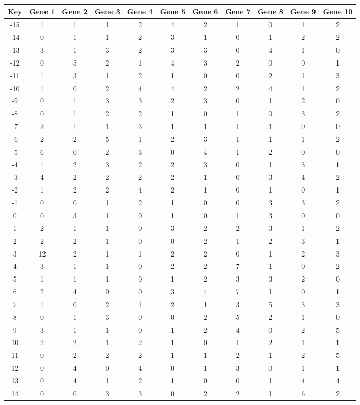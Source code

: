 \begin{tabular}{|c|c|c|c|c|c|c|c|c|c|c|}
\hline
Key & Gene 1 & Gene 2 & Gene 3 & Gene 4 & Gene 5 & Gene 6 & Gene 7 & Gene 8 & Gene 9 & Gene 10 \\
\hline
-15 & 1 & 1 & 1 & 2 & 4 & 2 & 1 & 0 & 1 & 2 \\
-14 & 0 & 1 & 1 & 2 & 3 & 1 & 0 & 1 & 2 & 2 \\
-13 & 3 & 1 & 3 & 2 & 3 & 3 & 0 & 4 & 1 & 0 \\
-12 & 0 & 5 & 2 & 1 & 4 & 3 & 2 & 0 & 0 & 1 \\
-11 & 1 & 3 & 1 & 2 & 1 & 0 & 0 & 2 & 1 & 3 \\
-10 & 1 & 0 & 2 & 4 & 4 & 2 & 2 & 4 & 1 & 2 \\
-9 & 0 & 1 & 3 & 3 & 2 & 3 & 0 & 1 & 2 & 0 \\
-8 & 0 & 1 & 2 & 2 & 1 & 0 & 1 & 0 & 3 & 2 \\
-7 & 2 & 1 & 1 & 3 & 1 & 1 & 1 & 1 & 0 & 0 \\
-6 & 2 & 2 & 5 & 1 & 2 & 3 & 1 & 1 & 1 & 2 \\
-5 & 6 & 0 & 2 & 3 & 0 & 4 & 1 & 2 & 0 & 0 \\
-4 & 1 & 2 & 3 & 2 & 2 & 3 & 0 & 1 & 3 & 1 \\
-3 & 4 & 2 & 2 & 2 & 2 & 1 & 0 & 3 & 4 & 2 \\
-2 & 1 & 2 & 2 & 4 & 2 & 1 & 0 & 1 & 0 & 1 \\
-1 & 0 & 0 & 1 & 2 & 1 & 0 & 0 & 3 & 3 & 2 \\
0 & 0 & 3 & 1 & 0 & 1 & 0 & 1 & 3 & 0 & 0 \\
1 & 2 & 1 & 1 & 0 & 3 & 2 & 2 & 3 & 1 & 2 \\
2 & 2 & 2 & 1 & 0 & 0 & 2 & 1 & 2 & 3 & 1 \\
3 & 12 & 2 & 1 & 1 & 2 & 2 & 0 & 1 & 2 & 3 \\
4 & 3 & 1 & 1 & 0 & 2 & 2 & 7 & 1 & 0 & 2 \\
5 & 1 & 1 & 1 & 0 & 1 & 2 & 3 & 3 & 2 & 0 \\
6 & 2 & 4 & 0 & 0 & 3 & 4 & 7 & 1 & 0 & 1 \\
7 & 1 & 0 & 2 & 1 & 2 & 1 & 3 & 5 & 3 & 3 \\
8 & 0 & 1 & 3 & 0 & 0 & 2 & 5 & 2 & 1 & 0 \\
9 & 3 & 1 & 1 & 0 & 1 & 2 & 4 & 0 & 2 & 5 \\
10 & 2 & 2 & 1 & 2 & 1 & 0 & 1 & 2 & 1 & 1 \\
11 & 0 & 2 & 2 & 2 & 1 & 1 & 2 & 1 & 2 & 5 \\
12 & 0 & 4 & 0 & 4 & 0 & 1 & 3 & 0 & 1 & 1 \\
13 & 0 & 4 & 1 & 2 & 1 & 0 & 0 & 1 & 4 & 4 \\
14 & 0 & 0 & 3 & 3 & 0 & 2 & 2 & 1 & 6 & 2 \\
\hline
\end{tabular}